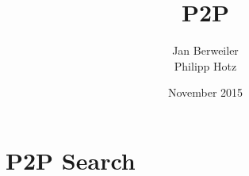 \documentclass{article}
\begin{document}
\title{P2P}
\author{Jan Berweiler \\
  Philipp Hotz}
\date{November 2015}

\maketitle

\begin{abstract}
  
\end{abstract}

\section{P2P Search}
\end{document}
